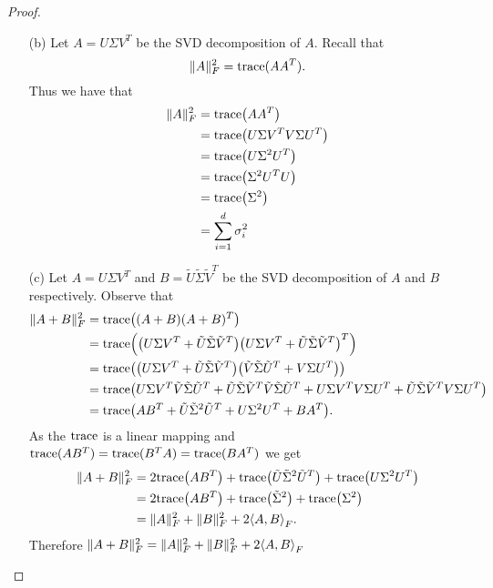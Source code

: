\documentclass[12pt]{report}
\begin{document}
\begin{problem}
\begin{proof}
\begin{enumerate}
    \item [(b)]
    Let $A = U \Sigma V^T$ be the SVD decomposition of $A$. Recall that
    \[
         \|A\|_F^2 = {\text{trace}}(AA^T).
    \]
    Thus we have that
    \begin{align*}
        \|A\|_F^2 &= {\text{trace}}{\left(AA^T\right)}\\
                &= {\text{trace}}{\left(U\Sigma V^T V \Sigma U^T\right)}\\
                &= {\text{trace}}{\left(U\Sigma^2 U^T\right)}\\
                &= {\text{trace}}{\left(\Sigma^2 U^TU\right)}\\
                &= {\text{trace}}{{\left(\Sigma^2\right)}}\\
                &= \sum_{i=1}^d\sigma_i^2
    \end{align*}

    \item[(c)] 
    Let $ A = U \Sigma V^T$ and $B = \tilde{U}\tilde{\Sigma}\tilde{V}^T$ be the SVD decomposition of $A$ and $B$ respectively. Observe that
    \begin{align*}
        \|A + B \|_F^2 &= {\text{trace}}{\left((A + B)(A + B)^T\right)}\\
        &= {\text{trace}}{\left({\left(U \Sigma V^T + \tilde{U}\tilde{\Sigma}\tilde{V}^T\right)}{\left(U \Sigma V^T + \tilde{U}\tilde{\Sigma}\tilde{V}^T\right)}^T\right)}\\
        &= {\text{trace}}{\left({\left(U \Sigma V^T + \tilde{U}\tilde{\Sigma}\tilde{V}^T\right)}{\left(\tilde{V}\tilde{\Sigma}\tilde{U}^T + V \Sigma U^T\right)}\right)}\\
        &= {\text{trace}}{\left(U \Sigma V^T\tilde{V}\tilde{\Sigma}\tilde{U}^T + \tilde{U}\tilde{\Sigma}\tilde{V}^T\tilde{V}\tilde{\Sigma}\tilde{U}^T + U \Sigma V^TV \Sigma U^T + \tilde{U}\tilde{\Sigma}\tilde{V}^TV \Sigma U^T\right)}\\
        &= {\text{trace}}{\left(AB^T + \tilde{U}\tilde{\Sigma}^2\tilde{U}^T + U \Sigma^2U^T + BA^T\right)}.
    \end{align*}
    As the ${\text{trace}}$ is a linear mapping and ${\text{trace}}(AB^T) = {\text{trace}}(B^TA) = {\text{trace}}(BA^T)$ we get
    \begin{align*}
        \|A + B \|_F^2 &= 2 {\text{trace}}{\left(AB^T\right)} + {\text{trace}}{\left(\tilde{U}\tilde{\Sigma}^2\tilde{U}^T\right)} + {\text{trace}}{\left(U \Sigma^2U^T\right)}\\
        &= 2 {\text{trace}}{\left(AB^T\right)} + {\text{trace}}{\left(\tilde{\Sigma}^2\right)} + {\text{trace}}{\left(\Sigma^2\right)}\\
        &= \|A\|_F^2 + \|B\|_F^2 + 2 {\left\langle A,B\right\rangle}_F. 
    \end{align*}
    Therefore $\|A + B \|_F^2 = \|A\|_F^2 + \|B\|_F^2 + 2 {\left\langle A,B\right\rangle}_F$


\end{enumerate}

\end{proof}
\end{problem}
\end{document}

